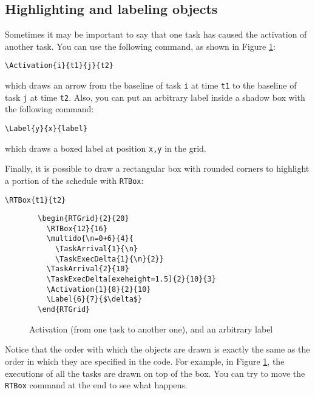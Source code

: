 \documentclass{article}
\begin{document}
\subsection{Highlighting and labeling objects}

Sometimes it may be important to say that one task has caused the
activation of another task. You can use the following command, as
shown in Figure \ref{fig:ex3a}:
\begin{verbatim}
\Activation{i}{t1}{j}{t2}
\end{verbatim}
which draws an arrow from the baseline of task \texttt{i} at time
\texttt{t1} to the baseline of task \texttt{j} at time \texttt{t2}.
Also, you can put an arbitrary label inside a shadow box with the
following command:
\begin{verbatim}
\Label{y}{x}{label}
\end{verbatim}
which draws a boxed label at position \texttt{x,y} in the grid.

Finally, it is possible to draw a rectangular box with rounded corners
to highlight a portion of the schedule with \texttt{RTBox}:
\begin{verbatim}
\RTBox{t1}{t2}
\end{verbatim}

\begin{figure}[h]
  \centering
  \begin{RTGrid}{2}{20}
  \end{RTGrid}
\begin{verbatim}
  \begin{RTGrid}{2}{20}
    \RTBox{12}{16}
    \multido{\n=0+6}{4}{
      \TaskArrival{1}{\n}
      \TaskExecDelta{1}{\n}{2}}
    \TaskArrival{2}{10}
    \TaskExecDelta[exeheight=1.5]{2}{10}{3}
    \Activation{1}{8}{2}{10}
    \Label{6}{7}{$\delta$}
  \end{RTGrid}
\end{verbatim}
  \caption{Activation (from one task to another one), and an arbitrary label}
  \label{fig:ex3a}
\end{figure}

Notice that the order with which the objects are drawn is exactly the
same as the order in which they are specified in the code. For
example, in Figure \ref{fig:ex3a}, the executions of all the tasks are
drawn on top of the box. You can try to move the \texttt{RTBox}
command at the end to see what happens.
\end{document}
